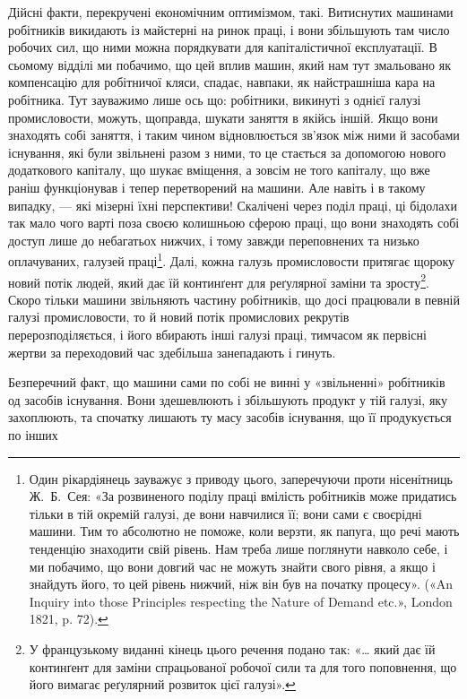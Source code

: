 Дійсні факти, перекручені економічним оптимізмом, такі.
Витиснутих машинами робітників викидають із майстерні на
ринок праці, і вони збільшують там число робочих сил, що ними
можна порядкувати для капіталістичної експлуатації. В сьомому
відділі ми побачимо, що цей вплив машин, який нам тут змальовано
як компенсацію для робітничої кляси, спадає, навпаки, як
найстрашніша кара на робітника. Тут зауважимо лише ось
що: робітники, викинуті з однієї галузі промисловости, можуть,
щоправда, шукати заняття в якійсь іншій. Якщо вони знаходять
собі заняття, і таким чином відновлюється зв’язок між ними й
засобами існування, які були звільнені разом з ними, то це
стається за допомогою нового додаткового капіталу, що шукає
вміщення, а зовсім не того капіталу, що вже раніш функціонував
і тепер перетворений на машини. Але навіть і в такому випадку,
— які мізерні їхні перспективи! Скалічені через поділ праці,
ці бідолахи так мало чого варті поза своєю колишньою сферою
праці, що вони знаходять собі доступ лише до небагатьох нижчих,
і тому завжди переповнених та низько оплачуваних, галузей
праці\footnote{
Один рікардіянець зауважує з приводу цього, заперечуючи проти
нісенітниць Ж.~Б.~Сея: «За розвиненого поділу праці вмілість робітників
може придатись тільки в тій окремій галузі, де вони навчилися її; вони
сами є своєрідні машини. Тим то абсолютно не поможе, коли верзти, як
папуга, що речі мають тенденцію знаходити свій рівень. Нам треба лише
поглянути навколо себе, і ми побачимо, що вони довгий час не можуть
знайти свого рівня, а якщо і знайдуть його, то цей рівень нижчий, ніж
він був на початку процесу». («An Inquiry into those Principles respecting
the Nature of Demand etc.», London 1821, p. 72).
}. Далі, кожна галузь промисловости притягає щороку
новий потік людей, який дає їй континґент для реґулярної заміни
та зросту\footnote*{
У французькому виданні кінець цього речення подано так: «\dots{} який
дає їй континґент для заміни спрацьованої робочої сили та для того поповнення,
що його вимагає реґулярний розвиток цієї галузі». 
}. Скоро тільки машини звільняють частину робітників,
що досі працювали в певній галузі промисловости, то й новий
потік промислових рекрутів перерозподіляється, і його вбирають
інші галузі праці, тимчасом як первісні жертви за переходовий
час здебільша занепадають і гинуть.

Безперечний факт, що машини сами по собі не винні у «звільненні»
робітників од засобів існування. Вони здешевлюють і
збільшують продукт у тій галузі, яку захоплюють, та спочатку
лишають ту масу засобів існування, що її продукується по інших
\parbreak{}  %
